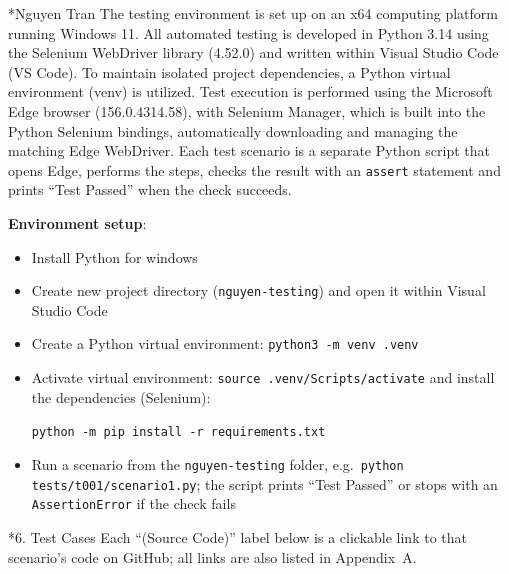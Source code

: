 \documentclass[11pt,a4paper]{article}
\makeatletter
\renewcommand\section{\@startsection{section}{1}{0pt}{3ex plus 1ex}{1.2ex}{\LARGE\bfseries}}
\renewcommand\subsection{\@startsection{subsection}{2}{0pt}{2ex plus .5ex}{.8ex}{\Large\bfseries}}
\makeatother
\begin{document}
\subsection*{Nguyen Tran}
The testing environment is set up on an x64 computing platform running Windows 11. All automated testing is developed in Python 3.14 using the Selenium WebDriver library (4.52.0) and written within Visual Studio Code (VS Code). To maintain isolated project dependencies, a Python virtual environment (venv) is utilized. Test execution is performed using the Microsoft Edge browser (156.0.4314.58), with Selenium Manager, which is built into the Python Selenium bindings, automatically downloading and managing the matching Edge WebDriver. Each test scenario is a separate Python script that opens Edge, performs the steps, checks the result with an \texttt{assert} statement and prints ``Test Passed'' when the check succeeds.

\textbf{Environment setup}:
\begin{itemize}
\item Install Python for windows 
\item Create new project directory (\texttt{nguyen-testing}) and open it within Visual Studio Code
\item Create a Python virtual environment: \texttt{python3 -m venv .venv}
\item Activate virtual environment: \texttt{source .venv/Scripts/activate} and install the dependencies (Selenium):

\texttt{python -m pip install -r requirements.txt}
\item Run a scenario from the \texttt{nguyen-testing} folder, e.g.\ \texttt{python tests/t001/scenario1.py}; the script prints ``Test Passed'' or stops with an \texttt{AssertionError} if the check fails
\end{itemize}

\clearpage
\section*{6. Test Cases}
Each ``(Source Code)'' label below is a clickable link to that scenario's code on GitHub; all links are also listed in Appendix~A.
\end{document}
